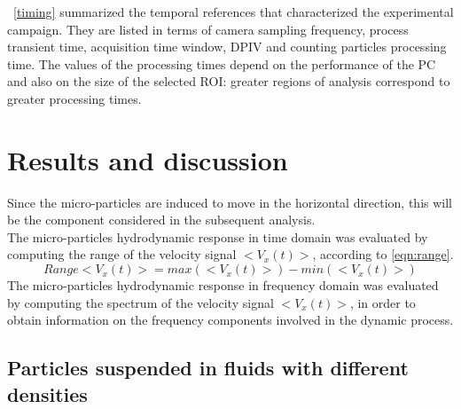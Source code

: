 \documentclass[journal]{IEEEtran}
\theoremstyle{definition}
\theoremstyle{remark}
\begin{document}
~\tab\ref{timing} summarized the temporal references that characterized the experimental campaign. They are listed in terms of camera sampling frequency, process transient time, acquisition time window, DPIV and counting particles processing time. 
The values of the processing times depend on the performance of the PC and also on the size of the selected ROI: greater regions of analysis correspond to greater processing times.


\section{Results and discussion}
Since the micro-particles are induced to move in the horizontal direction, this will be the component considered in the subsequent analysis. 
\\The micro-particles hydrodynamic response in time domain was evaluated by computing the range of the velocity signal $<V_x(t)>$, according to \eqn \ref{eqn:range}. 
\begin{equation}
	\label{eqn:range}
	Range<V_x(t)>=max(<V_x(t)>)-min(<V_x(t)>)
\end{equation}
The micro-particles hydrodynamic response in frequency domain was evaluated by computing the spectrum of the velocity signal $<V_x(t)>$, in order to obtain information on the frequency components involved in the dynamic process.

\subsection{Particles suspended in fluids with different densities}\label{sec:suspended-particles}
\end{document}
